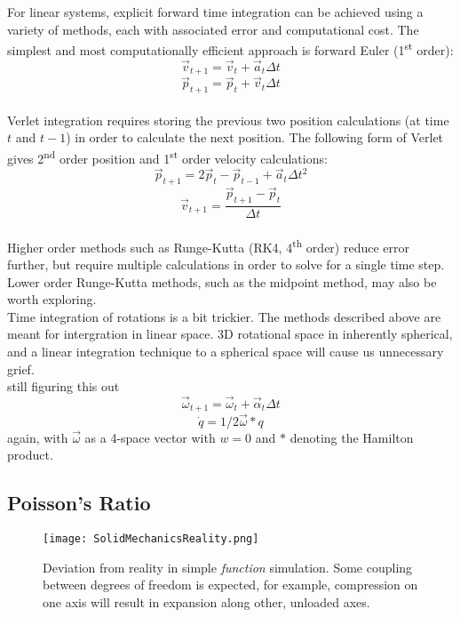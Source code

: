 {For linear systems, explicit forward time integration can be achieved using a variety of methods, each with associated error and computational cost.  The simplest and most computationally efficient approach is forward Euler (1\textsuperscript{st} order):
\[ \vec{v}_{t+1} = \vec{v}_{t} +  \vec{a}_{t}\Delta t\]
\[ \vec{p}_{t+1} = \vec{p}_{t} +  \vec{v}_{t}\Delta t\]\\

Verlet integration requires storing the previous two position calculations (at time $t$ and $t-1$) in order to calculate the next position.  The following form of Verlet gives 2\textsuperscript{nd} order position and 1\textsuperscript{st} order velocity calculations:
\[ \vec{p}_{t+1} = 2\vec{p}_{t} - \vec{p}_{t-1} +  \vec{a}_{t}\Delta t^2\]
\[ \vec{v}_{t+1} = \dfrac{\vec{p}_{t+1} - \vec{p}_{t}}{\Delta t}\]\\

Higher order methods such as Runge-Kutta (RK4, 4\textsuperscript{th} order) reduce error further, but require multiple calculations in order to solve for a single time step.  Lower order Runge-Kutta methods, such as the midpoint method, may also be worth exploring.\\

Time integration of rotations is a bit trickier.  The methods described above are meant for intergration in linear space.  3D rotational space in inherently spherical, and a linear integration technique to a spherical space will cause us unnecessary grief.\\

still figuring this out\\

\[ \vec{\omega}_{t+1} = \vec{\omega}_{t} +  \vec{\alpha}_{t}\Delta t\]
\[ \dot{q} = 1/2\vec{\omega}*q\]
again, with $\vec{\omega}$ as a 4-space vector with $w=0$ and $*$ denoting the Hamilton product.

\subsection{Poisson's Ratio}

\begin{figure}
  \texttt{[image: SolidMechanicsReality.png]}
  \caption{Deviation from reality in simple \textit{function} simulation.  Some coupling between degrees of freedom is expected, for example, compression on one axis will result in expansion along other, unloaded axes.}
  \label{fig:SolidMechanicsReality}
\end{figure}

}
